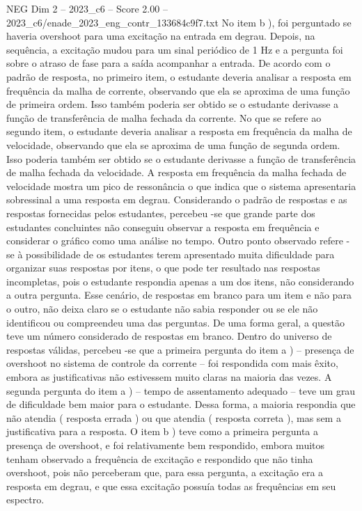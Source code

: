 \begin{textsample}{NEG Dim 2 – 2023\_c6 – Score 2.00 – 2023\_c6/enade\_2023\_eng\_contr\_133684c9f7.txt}
No item b ), foi perguntado se haveria overshoot para uma excitação na entrada em degrau.
Depois, na sequência, a excitação mudou para um sinal periódico de 1 Hz e a pergunta foi sobre o atraso de fase para a saída acompanhar a entrada.
De acordo com o padrão de resposta, no primeiro item, o estudante deveria analisar a resposta em frequência da malha de corrente, observando que ela se aproxima de uma função de primeira ordem.
Isso também poderia ser obtido se o estudante derivasse a função de transferência de malha fechada da corrente.
No que se refere ao segundo item, o estudante deveria analisar a resposta em frequência da malha de velocidade, observando que ela se aproxima de uma função de segunda ordem.
Isso poderia também ser obtido se o estudante derivasse a função de transferência de malha fechada da velocidade.
A resposta em frequência da malha fechada de velocidade mostra um pico de ressonância o que indica que o sistema apresentaria sobressinal a uma resposta em degrau.
Considerando o padrão de respostas e as respostas fornecidas pelos estudantes, percebeu -se que grande parte dos estudantes concluintes não conseguiu observar a resposta em frequência e considerar o gráfico como uma análise no tempo.
Outro ponto observado refere -se à possibilidade de os estudantes terem apresentado muita dificuldade para organizar suas respostas por itens, o que pode ter resultado nas respostas incompletas, pois o estudante respondia apenas a um dos itens, não considerando a outra pergunta.
Esse cenário, de respostas em branco para um item e não para o outro, não deixa claro se o estudante não sabia responder ou se ele não identificou ou compreendeu uma das perguntas.
De uma forma geral, a questão teve um número considerado de respostas em branco.
Dentro do universo de respostas válidas, percebeu -se que a primeira pergunta do item a ) – presença de overshoot no sistema de controle da corrente – foi respondida com mais êxito, embora as justificativas não estivessem muito claras na maioria das vezes.
A segunda pergunta do item a ) – tempo de assentamento adequado – teve um grau de dificuldade bem maior para o estudante.
Dessa forma, a maioria respondia que não atendia ( resposta errada ) ou que atendia ( resposta correta ), mas sem a justificativa para a resposta.
O item b ) teve como a primeira pergunta a presença de overshoot, e foi relativamente bem respondido, embora muitos tenham observado a frequência de excitação e respondido que não tinha overshoot, pois não perceberam que, para essa pergunta, a excitação era a resposta em degrau, e que essa excitação possuía todas as frequências em seu espectro.

\end{textsample}
